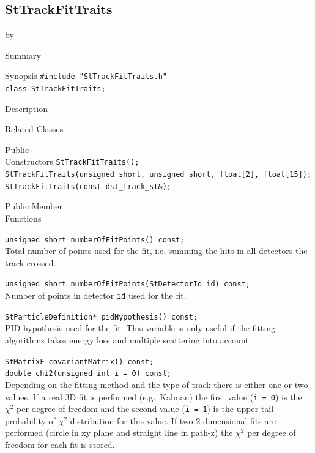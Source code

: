 \documentclass[twoside]{article}
\newcommand{\entrylabel}[1]{\mbox{\textbf{{#1}}}\hfil}%
\newenvironment{entry}
{\begin{list}{}%
    {\renewcommand{\makelabel}{\entrylabel}%
     \setlength{\labelwidth}{90pt}%
     \setlength{\leftmargin}{\labelwidth}
     \advance\leftmargin by \labelsep%
      }%
    }%
  {\end{list}}
\newcommand{\Entrylabel}[1]%
{\raisebox{0pt}[1ex][0pt]{\makebox[\labelwidth][l]%
    {\parbox[t]{\labelwidth}{\hspace{0pt}\textbf{{#1}}}}}}
\newenvironment{Entry}%
{\renewcommand{\entrylabel}{\Entrylabel}\begin{entry}}%
  {\end{entry}}
\begin{document}
\subsection{StTrackFitTraits}
\label{sec:StTrackFitTraits}
\begin{Entry}
\item[Summary]
\item[Synopsis]
    \verb+#include "StTrackFitTraits.h"+\\
    \verb+class StTrackFitTraits;+\\
\item[Description]
\item[Related Classes]
\item[Public\\ Constructors]
    \verb+StTrackFitTraits();+\\
    \verb+StTrackFitTraits(unsigned short, unsigned short, float[2], float[15]);+\\
    \verb+StTrackFitTraits(const dst_track_st&);+\\
\item[Public Member\\ Functions]
    
    \verb+unsigned short numberOfFitPoints() const;+\\
    Total number of points used for the fit, i.e. summing the
    hits in all detectors the track crossed.
    
    \verb+unsigned short numberOfFitPoints(StDetectorId id) const;+\\
    Number of points in detector \texttt{id} used for the fit.
    
    \verb+StParticleDefinition* pidHypothesis() const;+\\
    PID hypothesis used for the fit. This variable is only
    useful if the fitting algorithms takes energy loss and
    multiple scattering into account.
    
    \verb+StMatrixF covariantMatrix() const;+\\

    \verb+double chi2(unsigned int i = 0) const;+\\
    Depending on the fitting method and the type of track there is either
    one or two values.
    If a real 3D fit is performed (e.g.~Kalman) the first value (\texttt{i = 0}) is the
    $\chi^2$ per degree of freedom and the second value (\texttt{i = 1}) is the
    upper tail probability of $\chi^2$ distribution for this value.
    If two 2-dimensional fits are performed (circle in xy plane and straight line in path-z)
    the $\chi^2$ per degree of freedom for each fit is stored.
     

\end{Entry}
\clearpage
\end{document}
